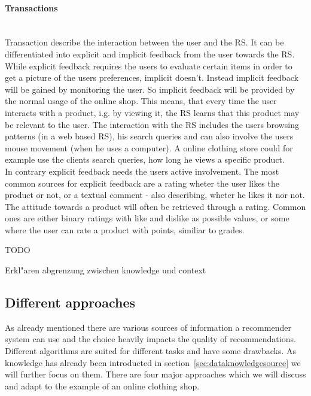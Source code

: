 \paragraph{Transactions}~\\
Transaction describe the interaction between the user and the RS.\citep[p.~9]{ricci:2011}
It can be differentiated into explicit and implicit feedback from the user towards the RS.
While explicit feedback requires the users to evaluate certain items in order to get a picture of the users preferences, implicit doesn't.
Instead implicit feedback will be gained by monitoring the user.\citep[p.~76-77]{lops:2011}
So implicit feedback will be provided by the normal usage of the online shop.
This means, that every time the user interacts with a product, i.g. by viewing it, the RS learns that this product may be relevant to the user.\citep{taghipour:2007}
The interaction with the RS includes the users browsing patterns (in a web based RS), his search queries and can also involve the users mouse movement (when he uses a computer).\citep[p.~146]{koren:2011}
A online clothing store could for example use the clients search queries, how long he views a specific product.\\
In contrary explicit feedback needs the users active involvement.
The most common sources for explicit feedback are a rating wheter the user likes the product or not, or a textual comment - also describing, wheter he likes it nor not.
The attitude towards a product will often be retrieved through a rating.
Common ones are either binary ratings with like and dislike as possible values, or some where the user can rate a product with points, similiar to grades.\citep[p.~77]{lops:2011}


TODO

Erkl"aren abgrenzung zwischen knowledge und context


\subsection{Different approaches}
\label{sec:recommenderapproaches}

As already mentioned there are various sources of information a recommender system can use and the choice heavily impacts the quality of recommendations.
Different algorithms are suited for different tasks and have some drawbacks.\citep[p.~377-378]{burke:2007}
As knowledge has already been introducted in section~\ref{sec:dataknowledgesource} we will further focus on them.
There are four major approaches which we will discuss and adapt to the example of an online clothing shop.

